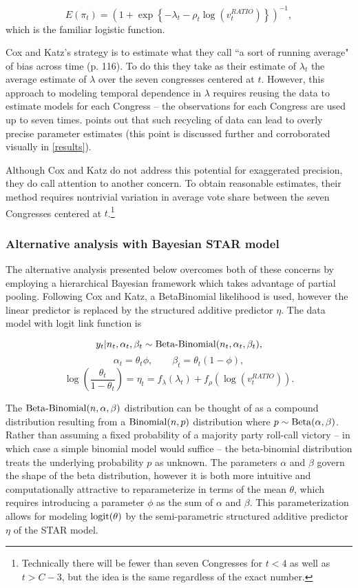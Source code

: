 \begin{equation*}
  E(\pi_t)  = \left(1 + \exp{\left\{- \lambda_t - \rho_t \log{\left( v_t^{RATIO}  \right)}\right\}}\right)^{-1},
\end{equation*}
%
\noindent which is the familiar logistic function. 

Cox and Katz's strategy is to estimate what they call ``a sort of running average" of bias across time (p. 116). To do this they take as their estimate of $\lambda_t$ the average estimate of $\lambda$ over the seven congresses centered at $t$. However, this approach to modeling temporal dependence in $\lambda$ requires reusing the data to estimate models for each Congress -- the observations for each Congress are used up to seven times.   points out that such recycling of data can lead to overly precise parameter estimates (this point is discussed further and corroborated visually in \ref{results}). 

Although Cox and Katz do not address this potential for exaggerated precision, they do call attention to another  concern. To obtain reasonable estimates, their method requires nontrivial variation in average vote share between the seven Congresses centered at $t$.\footnote{Technically there will be fewer than seven Congresses for $t < 4$ as well as $t > C- 3$, but the idea is the same regardless of the exact number.}

\subsubsection{Alternative analysis with Bayesian STAR model}

The alternative analysis presented below overcomes both of these concerns by employing a hierarchical Bayesian framework which takes advantage of partial pooling. Following Cox and Katz, a BetaBinomial likelihood is used, however the linear predictor is replaced by the structured additive predictor $\eta$. The data model with logit link function is 

$$y_t | n_t, \alpha_t, \beta_t \sim {\rm Beta\text{-}Binomial}(n_t, \alpha_t, \beta_t),$$
$$ \alpha_t = \theta_t \phi, \qquad \beta_t = \theta_t (1 - \phi),$$
$$ \log\left({\frac{\theta_t}{1 - \theta_t}}\right) = \eta_t = f_{\lambda}(\lambda_t) + f_\rho \left(\log{(v_t^{RATIO})}\right).$$

The ${\rm Beta\text{-}Binomial}(n,\alpha,\beta)$ distribution can be thought of as a compound distribution resulting from a ${\rm Binomial}(n,p)$ distribution where $p \sim {\rm Beta}(\alpha,\beta)$. Rather than assuming a fixed probability of a majority party roll-call victory -- in which case a simple binomial model would suffice -- the beta-binomial distribution treats the underlying probability $p$ as unknown. The parameters $\alpha$ and $\beta$ govern the shape of the beta distribution, however it is both more intuitive and computationally attractive to reparameterize in terms of the mean $\theta$, which requires introducing a parameter $\phi$ as the sum of $\alpha$ and $\beta$.  This parameterization allows for modeling ${\rm logit}(\theta)$ by the semi-parametric structured additive predictor $\eta$ of the STAR model. 


